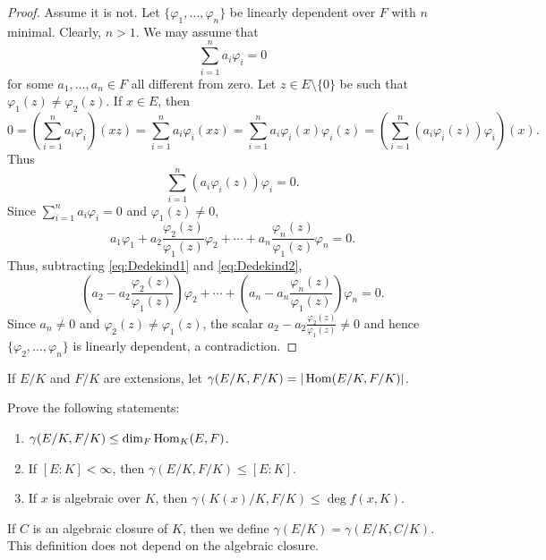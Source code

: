 \begin{proof}
    Assume it is not. Let $\{\varphi_1,\dots,\varphi_n\}$ 
    be linearly dependent over $F$ with $n$ minimal. Clearly, $n>1$. 
    We may assume that 
    \begin{equation}
        \label{eq:Dedekind1}
        \sum_{i=1}^n a_i\varphi_i=0
    \end{equation}
    for some $a_1,\dots,a_n\in F$ all different from zero. 
    Let
    $z\in E\setminus\{0\}$ be such that $\varphi_1(z)\ne\varphi_2(z)$. If $x\in E$, then
    \[
    0=\left(\sum_{i=1}^na_i\varphi_i\right)(xz)=\sum_{i=1}^na_i\varphi_i(xz)
    =\sum_{i=1}^na_i\varphi_i(x)\varphi_i(z)
    =\left(\sum_{i=1}^n (a_i\varphi_i(z))\varphi_i\right)(x).
    \]
    Thus 
    \begin{equation}
        \label{eq:Dedekind2}
        \sum_{i=1}^n (a_i\varphi_i(z))\varphi_i=0.
    \end{equation}
    Since $\sum_{i=1}^na_i\varphi_i=0$ and $\varphi_1(z)\ne0$, 
    \[
    a_1\varphi_1+a_2\frac{\varphi_2(z)}{\varphi_1(z)}\varphi_2+\cdots+a_n\frac{\varphi_n(z)}{\varphi_1(z)}\varphi_n=0.
    \]
    Thus, 
    subtracting \eqref{eq:Dedekind1} and \eqref{eq:Dedekind2}, 
    \[
    \left(a_2-a_2\frac{\varphi_2(z)}{\varphi_1(z)}\right)\varphi_2
    +\cdots+\left(a_n-a_n\frac{\varphi_n(z)}{\varphi_1(z)}\right)\varphi_n=0.
    \]
    Since $a_n\ne 0$ and $\varphi_2(z)\ne\varphi_1(z)$, 
    the scalar $a_2-a_2\frac{\varphi_2(z)}{\varphi_1(z)}\ne 0$ and hence 
    $\{\varphi_2,\dots,\varphi_n\}$ is linearly dependent, a contradiction. 
\end{proof}

If $E/K$ and $F/K$ are extensions, 
let $\gamma(E/K,F/K)=|\operatorname{Hom}(E/K,F/K)|$. 

\begin{exercise}
Prove the following statements:
\begin{enumerate}
    \item $\gamma(E/K,F/K)\leq\dim_F\operatorname{Hom}_K(E,F)$.
    \item If $[E:K]<\infty$, then $\gamma(E/K,F/K)\leq[E:K]$. 
    \item If $x$ is algebraic over $K$, then $\gamma(K(x)/K,F/K)\leq\deg f(x,K)$.
\end{enumerate}
\end{exercise}

If $C$ is an algebraic closure of $K$,
then we define $\gamma(E/K)=\gamma(E/K,C/K)$. This definition does
not depend on the algebraic closure. 

